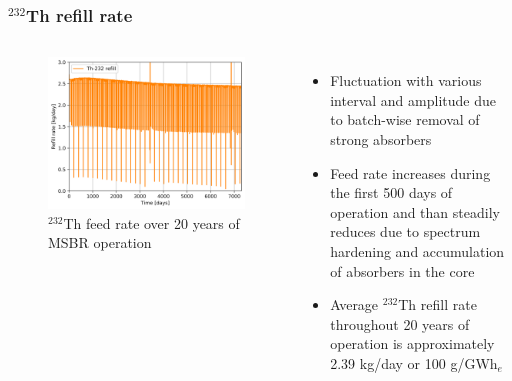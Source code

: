 \begin{frame}
  \frametitle{$^{232}$Th refill rate}
    \begin{columns}
    \column[t]{7cm}
   \vspace{-0.35in}
  \begin{figure}[t]
   \hspace*{-0.2in}
   \includegraphics[height=0.75\textheight]{./images/Th_refill_rate.png}
   \vspace{-0.05in}
   \caption{$^{232}$Th feed rate over 20 years of \gls{MSBR} operation}
    \end{figure}

    \column[t]{4.5cm}
       \begin{itemize}
	        \item Fluctuation with various interval and amplitude due to batch-wise removal of strong absorbers
   		\item Feed rate increases during the first 500 days of operation and than steadily reduces due to spectrum hardening and accumulation of absorbers in the core
   		\item Average $^{232}$Th refill rate throughout 20 years of operation is approximately 2.39 kg/day or 100 g/GWh$_e$
       \end{itemize}
     \end{columns}
\end{frame}

